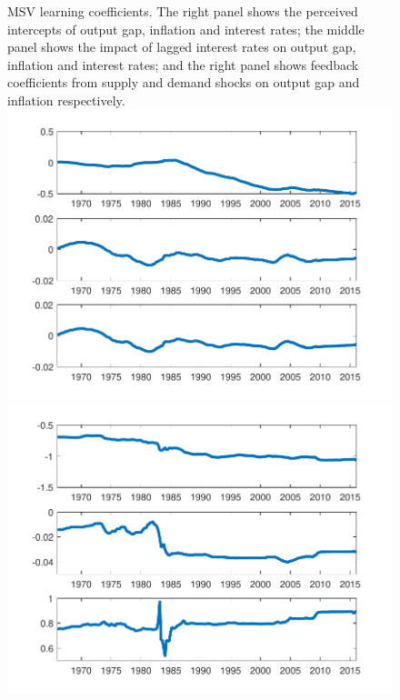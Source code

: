 \documentclass[12pt,reqno]{article}
\numberwithin{equation}{section}
\begin{document}
\begin{figure}[H]
{MSV learning coefficients. The right panel shows the perceived intercepts of output gap, inflation and interest rates; the middle panel shows the impact of lagged interest rates on output gap, inflation and interest rates; and the right panel shows feedback coefficients from supply and demand shocks on output gap and inflation respectively. }\\
\includegraphics[scale=0.35]{NKPC_ree_init_MSV_alphas.pdf}
\includegraphics[scale=0.35]{NKPC_ree_init_MSV_betas.pdf}

\end{figure}
\end{document}
